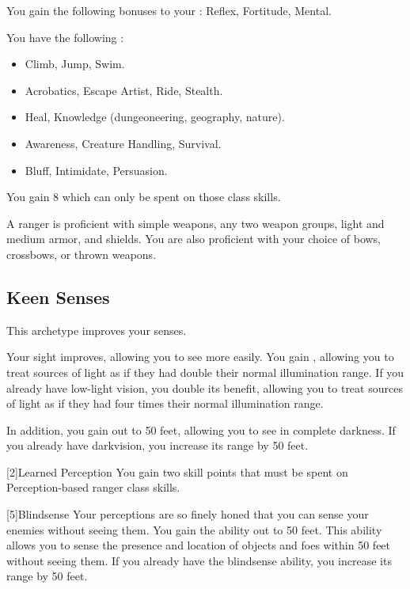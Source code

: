         You gain the following bonuses to your :  Reflex,  Fortitude,  Mental.

        You have the following :
        \begin{itemize}
            \item {} Climb, Jump, Swim.
            \item {} Acrobatics, Escape Artist, Ride, Stealth.
            \item {} Heal, Knowledge (dungeoneering, geography, nature).
            \item {} Awareness, Creature Handling, Survival.
            \item {} Bluff, Intimidate, Persuasion.
        \end{itemize}
        You gain 8  which can only be spent on those class skills.

        A ranger is proficient with simple weapons, any two weapon groups, light and medium armor, and shields.
        You are also proficient with your choice of bows, crossbows, or thrown weapons.

    \subsection{Keen Senses}
        This archetype improves your senses.

        Your sight improves, allowing you to see more easily.
        You gain , allowing you to treat sources of light as if they had double their normal illumination range.
        If you already have low-light vision, you double its benefit, allowing you to treat sources of light as if they had four times their normal illumination range.

        In addition, you gain  out to 50 feet, allowing you to see in complete darkness.
        If you already have darkvision, you increase its range by 50 feet.

        [2]{Learned Perception} You gain two skill points that must be spent on Perception-based ranger class skills.

        [5]{Blindsense}
        Your perceptions are so finely honed that you can sense your enemies without seeing them.
        You gain the  ability out to 50 feet.
        This ability allows you to sense the presence and location of objects and foes within 50 feet without seeing them.
        If you already have the blindsense ability, you increase its range by 50 feet.

